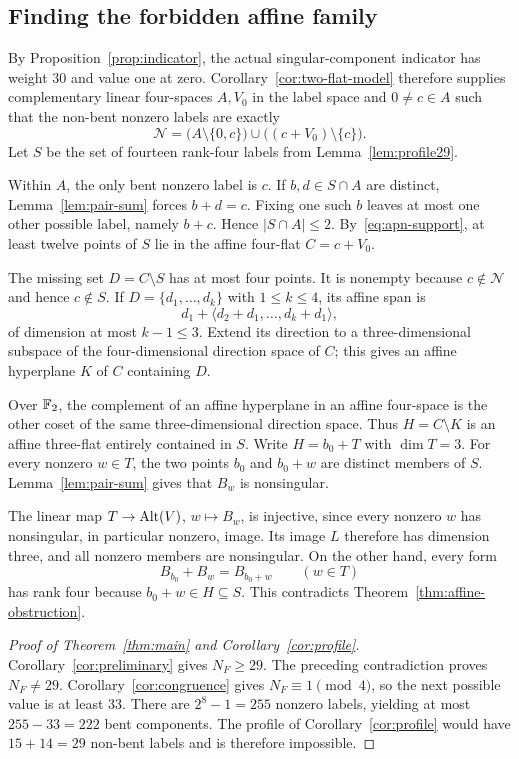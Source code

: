 \subsection{Finding the forbidden affine family}
By Proposition~\ref{prop:indicator}, the actual singular-component indicator has weight $30$ and value one at zero. Corollary~\ref{cor:two-flat-model} therefore supplies complementary linear four-spaces $A,V_0$ in the label space and $0\ne c\in A$ such that the non-bent nonzero labels are exactly
\begin{equation}\label{eq:apn-support}
\mathcal N=\bigl(A\setminus\{0,c\}\bigr)
\cup\bigl((c+V_0)\setminus\{c\}\bigr).
\end{equation}
Let $S$ be the set of fourteen rank-four labels from Lemma~\ref{lem:profile29}.

Within $A$, the only bent nonzero label is $c$. If $b,d\in S\cap A$ are distinct, Lemma~\ref{lem:pair-sum} forces $b+d=c$. Fixing one such $b$ leaves at most one other possible label, namely $b+c$. Hence $|S\cap A|\le2$. By~\eqref{eq:apn-support}, at least twelve points of $S$ lie in the affine four-flat $C=c+V_0$.

The missing set $D=C\setminus S$ has at most four points. It is nonempty because $c\notin\mathcal N$ and hence $c\notin S$. If $D=\{d_1,\ldots,d_k\}$ with $1\le k\le4$, its affine span is
\[
d_1+\langle d_2+d_1,\ldots,d_k+d_1\rangle,
\]
of dimension at most $k-1\le3$. Extend its direction to a three-dimensional subspace of the four-dimensional direction space of $C$; this gives an affine hyperplane $K$ of $C$ containing $D$.

Over $\mathbb F_2$, the complement of an affine hyperplane in an affine four-space is the other coset of the same three-dimensional direction space. Thus $H=C\setminus K$ is an affine three-flat entirely contained in $S$. Write $H=b_0+T$ with $\dim T=3$. For every nonzero $w\in T$, the two points $b_0$ and $b_0+w$ are distinct members of $S$. Lemma~\ref{lem:pair-sum} gives that $B_w$ is nonsingular.

The linear map $T\to\operatorname{Alt}(V)$, $w\mapsto B_w$, is injective, since every nonzero $w$ has nonsingular, in particular nonzero, image. Its image $L$ therefore has dimension three, and all nonzero members are nonsingular. On the other hand, every form
\[
B_{b_0}+B_w=B_{b_0+w}\qquad(w\in T)
\]
has rank four because $b_0+w\in H\subseteq S$. This contradicts Theorem~\ref{thm:affine-obstruction}.

\begin{proof}[Proof of Theorem~\ref{thm:main} and Corollary~\ref{cor:profile}]
Corollary~\ref{cor:preliminary} gives $N_F\ge29$. The preceding contradiction proves $N_F\ne29$. Corollary~\ref{cor:congruence} gives $N_F\equiv1\pmod4$, so the next possible value is at least $33$. There are $2^8-1=255$ nonzero labels, yielding at most $255-33=222$ bent components. The profile of Corollary~\ref{cor:profile} would have $15+14=29$ non-bent labels and is therefore impossible.
\end{proof}

